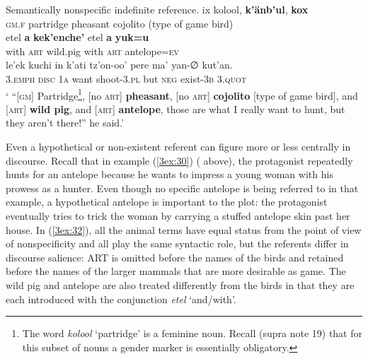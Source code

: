\documentclass[output=paper]{langsci/langscibook}
\begin{document}
\begin{exe}
\ex\label{3ex:32}
Semantically nonspecific indefinite reference. 
\exi{}
\gll	ix			kolool,	{\textbf{k'\"anb'ul}},	{\textbf{kox}} \\
	{\textsc{gm.f}}		partridge	pheasant		{cojolito (type of game bird)} \\
\glt
\exi{}
\gll	etel	{\textbf{a}}	{\textbf{kek'enche'}}	etel	{\textbf{a}}	{\textbf{yuk=u}} \\
	with	{\textsc{art}}	wild.pig			with	{\textsc{art}}	antelope={\textsc{ev}} \\
\glt
\exi{}
\gll	le'ek			kuchi			in		k'ati		tz'on-oo' 			pere		ma'		yan-{∅}		kut'an.\\
	{\textsc{3.emph}}	{\textsc{disc}}		{\textsc{1a}}	want		shoot-{\textsc{3.pl}} 	but		{\textsc{neg}}	exist-{\textsc{3b}}	{\textsc{3.quot}} \\
\glt	` ``[{\textsc{gm}}] Partridge\footnote{The word {\emph{kolool}} `partridge' is a feminine noun.  Recall (supra note 19) that for this subset of nouns a gender marker is essentially obligatory.}, [no {\textsc{art}}] {\textbf{pheasant}}, [no {\textsc{art}}] {\textbf{cojolito}} [type of game bird], and [{\textsc{art}}] {\textbf{wild pig}}, and [{\textsc{art}}] {\textbf{antelope}}, those are what I really want to hunt, but they aren't there!'' he said.'
\end{exe}

Even a hypothetical or non-existent referent can figure more or less centrally in discourse.  Recall that in example (\ref{3ex:30}) ( above), the protagonist repeatedly hunts for an antelope because he wants to impress a young woman with his prowess as a hunter.  Even though no specific antelope is being referred to in that example, a hypothetical antelope is important to the plot: the protagonist eventually tries to trick the woman by carrying a stuffed antelope skin past her house. In (\ref{3ex:32}), all the animal terms have equal status from the point of view of nonspecificity and all play the same syntactic role, but the referents differ in discourse salience: ART is omitted before the names of the birds and retained before the names of the larger mammals that are more desirable as game.  The wild pig and antelope are also treated differently from the birds in that they are each introduced with the conjunction {\emph{etel}} `and/with'.
\end{document}
